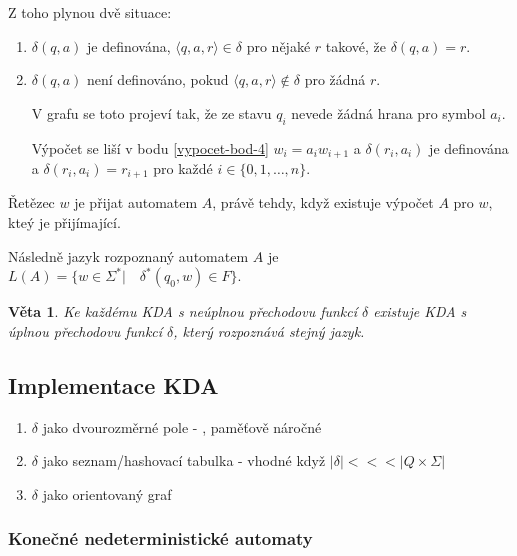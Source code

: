 \documentclass[10pt,a4paper]{article}
\theoremstyle{note}
\newtheorem{veta}{Věta}
\begin{document}
Z toho plynou dvě situace:
\begin{enumerate}
\item
$\delta(q, a)$ je definována, $\langle q,a,r \rangle \in \delta$ pro nějaké $r$ takové, že $\delta(q,a) = r$.

\item
$\delta(q,a)$ není definováno, pokud $\langle q, a, r \rangle \notin \delta$ pro žádná $r$.

V grafu se toto projeví tak, že ze stavu $q_i$ nevede žádná hrana pro symbol $a_i$.

Výpočet se liší v bodu \ref{vypocet-bod-4} $w_i = a_i w_{i+1}$ a $\delta(r_i, a_i)$ je definována a $\delta(r_i,a_i) = r_{i+1}$
pro každé $i \in \lbrace 0,1,\ldots,n \rbrace$.
\end{enumerate}

Řetězec $w$ je přijat automatem $A$, právě tehdy, když existuje výpočet $A$ pro $w$, kteý je přijímající.

Následně jazyk rozpoznaný automatem $A$ je $L(A) = \lbrace w \in \Sigma^*| \quad \delta^*(q_0,w) \in F \rbrace$.

\begin{veta}
Ke každému KDA s neúplnou přechodovu funkcí $\delta$ existuje KDA s úplnou přechodovu funkcí $\delta$, který rozpoznává stejný jazyk.
\end{veta}


\subsection{Implementace KDA}
\begin{enumerate}
\item $\delta$ jako dvourozměrné pole - , paměťově náročné
\item $\delta$ jako seznam/hashovací tabulka - vhodné když $|\delta | <<< |Q\times \Sigma |$
\item $\delta$ jako orientovaný graf
\end{enumerate}


\subsubsection{Konečné nedeterministické automaty}
\end{document}
